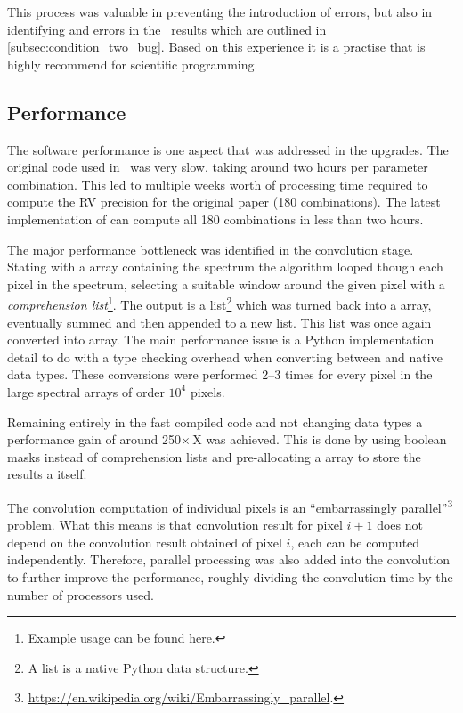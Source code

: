 This process was valuable in preventing the introduction of errors, but also in identifying and errors in the~\citep{figueira_radial_2016} results which are outlined in \cref{subsec:condition_two_bug}.
Based on this experience it is a practise that is highly recommend for scientific programming.


\subsection{Performance}
\label{subsec:code_performance}
The software performance is one aspect that was addressed in the upgrades.
The original code used in~\citet{figueira_radial_2016} was very slow, taking around two hours per parameter combination.
This led to multiple weeks worth of processing time required to compute the {RV} precision for the original paper (180 combinations).
The latest implementation of \eniric{} can compute all 180 combinations in less than two hours.

The major performance bottleneck was identified in the convolution stage.
Stating with a \numpy{} array containing the spectrum the algorithm looped though each pixel in the spectrum, selecting a suitable window around the given pixel with a \emph{comprehension list}\footnote{Example usage can be found \href{https://docs.python.org/3/tutorial/datastructures.html\#list-comprehensions}{here}.}.
The output is a list\footnote{A list is a native Python data structure.} which was turned back into a \numpy{} array, eventually summed and then appended to a new list.
This list was once again converted into \numpy{} array.
The main performance issue is a Python implementation detail to do with a type checking overhead when converting between \numpy{} and native data types.
These conversions were performed 2--3 times for every pixel in the large spectral arrays of order \({10}^{4}\) pixels.

Remaining entirely in the fast compiled \numpy{} code and not changing data types a performance gain of around 250\(\times\)\,X was achieved.
This is done by using boolean masks instead of comprehension lists and pre-allocating a \numpy{} array to store the results a itself.

The convolution computation of individual pixels is an ``embarrassingly parallel''\footnote{\href{https://en.wikipedia.org/wiki/Embarrassingly\_parallel}{https://en.wikipedia.org/wiki/Embarrassingly\_parallel}.} problem.
What this means is that convolution result for pixel $i+1$ does not depend on the convolution result obtained of pixel $i$, each can be computed independently.
Therefore, parallel processing was also added into the convolution to further improve the performance, roughly dividing the convolution time by the number of processors used.

